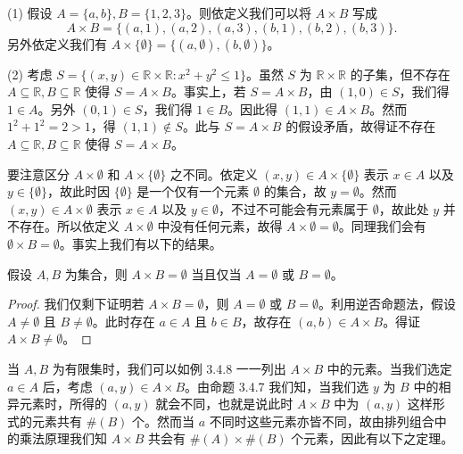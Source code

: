 \begin{example}
(1) 假设 $A = \{a, b\}, B = \{1, 2, 3\}$。则依定义我们可以将 $A \times B$ 写成
$$ A \times B = \{(a, 1), (a, 2), (a, 3), (b, 1), (b, 2), (b, 3)\}. $$
另外依定义我们有 $A \times \{\emptyset\} = \{(a, \emptyset), (b, \emptyset)\}$。

(2) 考虑 $S = \{(x, y) \in \mathbb{R} \times \mathbb{R} : x^2 + y^2 \leq 1\}$。虽然 $S$ 为 $\mathbb{R} \times \mathbb{R}$ 的子集，但不存在 $A \subseteq \mathbb{R}, B \subseteq \mathbb{R}$ 使得 $S = A \times B$。事实上，若 $S = A \times B$，由 $(1, 0) \in S$，我们得 $1 \in A$。另外 $(0, 1) \in S$，我们得 $1 \in B$。因此得 $(1, 1) \in A \times B$。然而 $1^2 + 1^2 = 2 > 1$，得 $(1, 1) \notin S$。此与 $S = A \times B$ 的假设矛盾，故得证不存在 $A \subseteq \mathbb{R}, B \subseteq \mathbb{R}$ 使得 $S = A \times B$。
\end{example}

要注意区分 $A \times \emptyset$ 和 $A \times \{\emptyset\}$ 之不同。依定义 $(x, y) \in A \times \{\emptyset\}$ 表示 $x \in A$ 以及 $y \in \{\emptyset\}$，故此时因 $\{\emptyset\}$ 是一个仅有一个元素 $\emptyset$ 的集合，故 $y = \emptyset$。然而 $(x, y) \in A \times \emptyset$ 表示 $x \in A$ 以及 $y \in \emptyset$，不过不可能会有元素属于 $\emptyset$，故此处 $y$ 并不存在。所以依定义 $A \times \emptyset$ 中没有任何元素，故得 $A \times \emptyset = \emptyset$。同理我们会有 $\emptyset \times B = \emptyset$。事实上我们有以下的结果。

\begin{proposition}
假设 $A, B$ 为集合，则 $A \times B = \emptyset$ 当且仅当 $A = \emptyset$ 或 $B = \emptyset$。
\end{proposition}

\begin{proof}
我们仅剩下证明若 $A \times B = \emptyset$，则 $A = \emptyset$ 或 $B = \emptyset$。利用逆否命题法，假设 $A \neq \emptyset$ 且 $B \neq \emptyset$。此时存在 $a \in A$ 且 $b \in B$，故存在 $(a, b) \in A \times B$。得证 $A \times B \neq \emptyset$。
\end{proof}

当 $A, B$ 为有限集时，我们可以如例 3.4.8 一一列出 $A \times B$ 中的元素。当我们选定 $a \in A$ 后，考虑 $(a, y) \in A \times B$。由命题 3.4.7 我们知，当我们选 $y$ 为 $B$ 中的相异元素时，所得的 $(a, y)$ 就会不同，也就是说此时 $A \times B$ 中为 $(a, y)$ 这样形式的元素共有 $\#(B)$ 个。然而当 $a$ 不同时这些元素亦皆不同，故由排列组合中的乘法原理我们知 $A \times B$ 共会有 $\#(A) \times \#(B)$ 个元素，因此有以下之定理。

